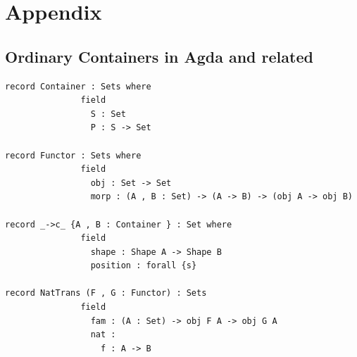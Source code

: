 \documentclass[12pt]{report}
\begin{document}
\chapter{Appendix}
\section{Ordinary Containers in Agda and related}
\begin{verbatim}
record Container : Sets where
               field
                 S : Set
                 P : S -> Set
                 
record Functor : Sets where
               field
                 obj : Set -> Set
                 morp : (A , B : Set) -> (A -> B) -> (obj A -> obj B)                 

record _->c_ {A , B : Container } : Set where
               field
                 shape : Shape A -> Shape B
                 position : forall {s} 
                 
record NatTrans (F , G : Functor) : Sets
               field
                 fam : (A : Set) -> obj F A -> obj G A 
                 nat : 
                   f : A -> B                 

\end{verbatim}
\end{document}

